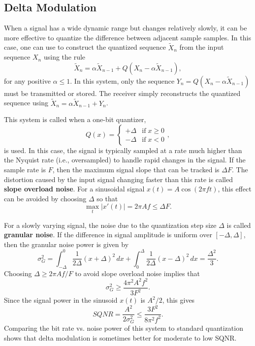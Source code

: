 \subsection{Delta Modulation}

When a signal has a wide dynamic range but changes relatively slowly, it can be more effective to quantize the difference between adjacent sample samples.
In this case, one can use  to construct the quantized sequence $\widetilde{X}_n$ from the input sequence $X_n$ using the rule
\[ \widetilde{X}_n = \alpha \widetilde{X}_{n-1} + Q \left( X_n - \alpha \widetilde{X}_{n-1} \right), \]
for any positive $\alpha \leq 1$.
In this system, only the sequence $Y_n = Q \left( X_n - \alpha \widetilde{X}_{n-1} \right)$ must be transmitted or stored.
The receiver simply reconstructs the quantized sequence using $\widetilde{X}_n = \alpha \widetilde{X}_{n-1} + Y_n$.

This system is called  when a one-bit quantizer,
\[ Q(x) = \begin{cases} +\Delta & \mathrm{if}\;x\geq 0 \\ -\Delta & \mathrm{if}\;x< 0 \end{cases}, \]
is used.
In this case, the signal is typically sampled at a rate much higher than the Nyquist rate (i.e., oversampled) to handle rapid changes in the signal.
If the sample rate is $F$, then the maximum signal slope that can be tracked is $\Delta F$.
The distortion caused by the input signal changing faster than this rate is called \textbf{slope overload noise}.
For a sinusoidal signal $x(t)=A \cos (2\pi f t)$, this effect can be avoided by choosing $\Delta$ so that
\[ \max_t \left| x'(t) \right| = 2\pi A f \leq \Delta F. \]

For a slowly varying signal, the noise due to the quantization step size $\Delta$ is called \textbf{granular noise}.
If the difference in signal amplitude is uniform over $[-\Delta,\Delta]$, then the granular noise power is given by
\[ \sigma^2_G = \int_{-\Delta}^{0} \frac{1}{2\Delta} (x+\Delta)^2 \, dx +  \int_{0}^{\Delta} \frac{1}{2\Delta} (x-\Delta)^2 \, dx = \frac{\Delta^2}{3}. \]
Choosing $\Delta \geq 2\pi A f / F$ to avoid slope overload noise implies that
\[ \sigma^2_G \geq \frac{4 \pi^2 A^2 f^2}{3  F^2} . \]
Since the signal power in the sinusoid $x(t)$ is $A^2 / 2$, this gives
\[ SQNR = \frac{A^2}{2\sigma^2_G} \leq \frac{3 F^2}{8 \pi^2 f^2}. \]
Comparing the bit rate vs. noise power of this system to standard quantization shows that delta modulation is sometimes better for moderate to low SQNR.

